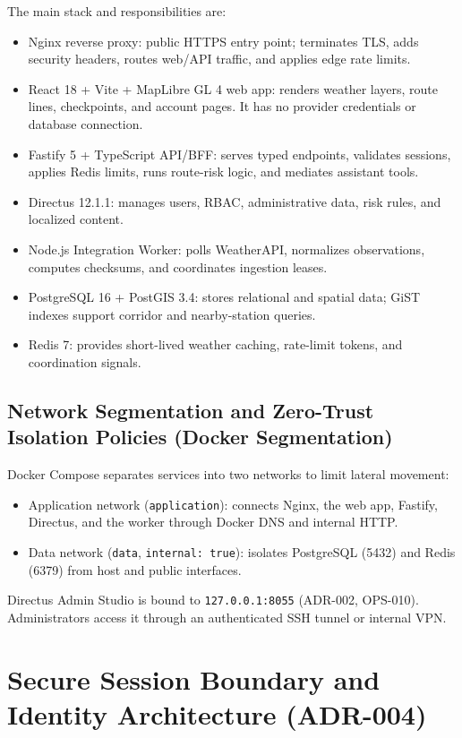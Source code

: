 The main stack and responsibilities are:
\begin{itemize}
    \item[-] Nginx reverse proxy: public HTTPS entry point; terminates TLS, adds security headers, routes web/API traffic, and applies edge rate limits.
    \item[-] React 18 + Vite + MapLibre GL 4 web app: renders weather layers, route lines, checkpoints, and account pages. It has no provider credentials or database connection.
    \item[-] Fastify 5 + TypeScript API/BFF: serves typed endpoints, validates sessions, applies Redis limits, runs route-risk logic, and mediates assistant tools.
    \item[-] Directus 12.1.1: manages users, RBAC, administrative data, risk rules, and localized content.
    \item[-] Node.js Integration Worker: polls WeatherAPI, normalizes observations, computes checksums, and coordinates ingestion leases.
    \item[-] PostgreSQL 16 + PostGIS 3.4: stores relational and spatial data; GiST indexes support corridor and nearby-station queries.
    \item[-] Redis 7: provides short-lived weather caching, rate-limit tokens, and coordination signals.
\end{itemize}

\subsection{Network Segmentation and Zero-Trust Isolation Policies (Docker Segmentation)}
Docker Compose separates services into two networks to limit lateral movement:
\begin{itemize}
    \item[-] Application network (\texttt{application}): connects Nginx, the web app, Fastify, Directus, and the worker through Docker DNS and internal HTTP.
    \item[-] Data network (\texttt{data}, \texttt{internal: true}): isolates PostgreSQL (5432) and Redis (6379) from host and public interfaces.
\end{itemize}

Directus Admin Studio is bound to \texttt{127.0.0.1:8055} (ADR-002, OPS-010). Administrators access it through an authenticated SSH tunnel or internal VPN.

\section{Secure Session Boundary and Identity Architecture (ADR-004)}
\label{sec:auth_session_boundary}

